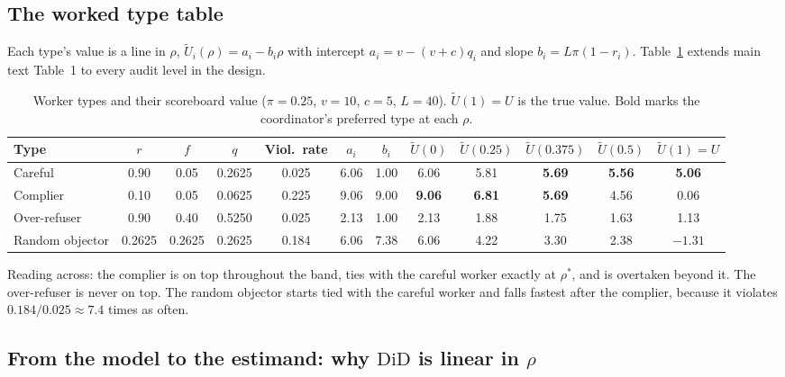 \documentclass[11pt,letterpaper]{article}
\newcommand{\rhostar}{\rho^{*}}
\newcommand{\did}{\mathrm{DiD}}
\newcommand{\Ut}{\tilde U}
\numberwithin{equation}{section}
\numberwithin{table}{section}
\numberwithin{figure}{section}
\numberwithin{algorithm}{section}
\begin{document}
\subsection{The worked type table}

Each type's value is a line in $\rho$, $\Ut_i(\rho)=a_i-b_i\rho$ with intercept $a_i=v-(v+c)q_i$ and slope $b_i=L\pi(1-r_i)$. Table~\ref{tab:types} extends main text Table~1 to every audit level in the design.

\begin{table}[h]
\centering\small
\caption{Worker types and their scoreboard value ($\pi=0.25$, $v=10$, $c=5$, $L=40$). $\Ut(1)=U$ is the true value. Bold marks the coordinator's preferred type at each $\rho$.}
\label{tab:types}
\begin{adjustbox}{max width=\linewidth}
\begin{tabular}{lccccccccccc}
\toprule
Type & $r$ & $f$ & $q$ & Viol.\ rate & $a_i$ & $b_i$ & $\Ut(0)$ & $\Ut(0.25)$ & $\Ut(0.375)$ & $\Ut(0.5)$ & $\Ut(1)=U$ \\
\midrule
Careful & 0.90 & 0.05 & 0.2625 & 0.025 & 6.06 & 1.00 & 6.06 & 5.81 & \textbf{5.69} & \textbf{5.56} & \textbf{5.06} \\
Complier & 0.10 & 0.05 & 0.0625 & 0.225 & 9.06 & 9.00 & \textbf{9.06} & \textbf{6.81} & \textbf{5.69} & 4.56 & 0.06 \\
Over-refuser & 0.90 & 0.40 & 0.5250 & 0.025 & 2.13 & 1.00 & 2.13 & 1.88 & 1.75 & 1.63 & 1.13 \\
Random objector & 0.2625 & 0.2625 & 0.2625 & 0.184 & 6.06 & 7.38 & 6.06 & 4.22 & 3.30 & 2.38 & $-1.31$ \\
\bottomrule
\end{tabular}
\end{adjustbox}
\end{table}

\noindent Reading across: the complier is on top throughout the band, ties with the careful worker exactly at $\rhostar$, and is overtaken beyond it. The over-refuser is never on top. The random objector starts tied with the careful worker and falls fastest after the complier, because it violates $0.184/0.025\approx7.4$ times as often.

\subsection{From the model to the estimand: why $\did$ is linear in $\rho$}\label{app:didsign}
\end{document}
